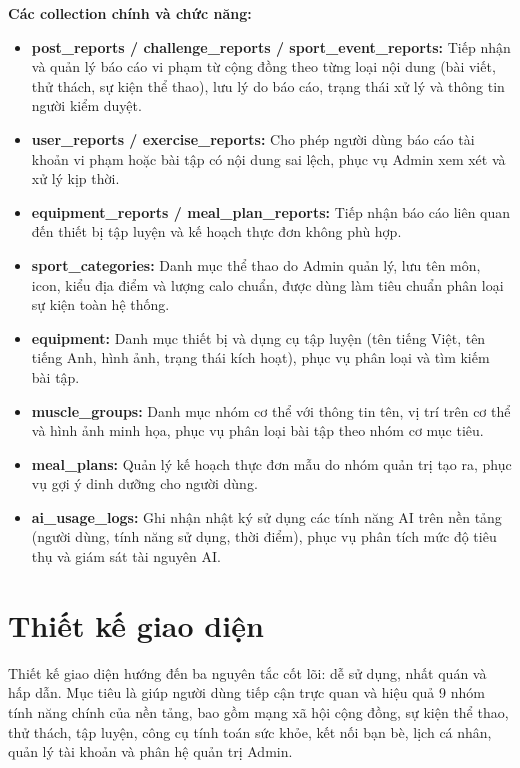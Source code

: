 \textbf{Các collection chính và chức năng:}
\begin{itemize}
    \item \textbf{post\_reports / challenge\_reports / sport\_event\_reports:} Tiếp nhận và quản lý báo cáo vi phạm từ cộng đồng theo từng loại nội dung (bài viết, thử thách, sự kiện thể thao), lưu lý do báo cáo, trạng thái xử lý và thông tin người kiểm duyệt.
    \item \textbf{user\_reports / exercise\_reports:} Cho phép người dùng báo cáo tài khoản vi phạm hoặc bài tập có nội dung sai lệch, phục vụ Admin xem xét và xử lý kịp thời.
    \item \textbf{equipment\_reports / meal\_plan\_reports:} Tiếp nhận báo cáo liên quan đến thiết bị tập luyện và kế hoạch thực đơn không phù hợp.
    \item \textbf{sport\_categories:} Danh mục thể thao do Admin quản lý, lưu tên môn, icon, kiểu địa điểm và lượng calo chuẩn, được dùng làm tiêu chuẩn phân loại sự kiện toàn hệ thống.
    \item \textbf{equipment:} Danh mục thiết bị và dụng cụ tập luyện (tên tiếng Việt, tên tiếng Anh, hình ảnh, trạng thái kích hoạt), phục vụ phân loại và tìm kiếm bài tập.
    \item \textbf{muscle\_groups:} Danh mục nhóm cơ thể với thông tin tên, vị trí trên cơ thể và hình ảnh minh họa, phục vụ phân loại bài tập theo nhóm cơ mục tiêu.
    \item \textbf{meal\_plans:} Quản lý kế hoạch thực đơn mẫu do nhóm quản trị tạo ra, phục vụ gợi ý dinh dưỡng cho người dùng.
    \item \textbf{ai\_usage\_logs:} Ghi nhận nhật ký sử dụng các tính năng AI trên nền tảng (người dùng, tính năng sử dụng, thời điểm), phục vụ phân tích mức độ tiêu thụ và giám sát tài nguyên AI.
\end{itemize}

\section{Thiết kế giao diện}
\label{sec:ui_ux_design}

Thiết kế giao diện hướng đến ba nguyên tắc cốt lõi: dễ sử dụng, nhất quán và hấp dẫn. Mục tiêu là giúp người dùng tiếp cận trực quan và hiệu quả 9 nhóm tính năng chính của nền tảng, bao gồm mạng xã hội cộng đồng, sự kiện thể thao, thử thách, tập luyện, công cụ tính toán sức khỏe, kết nối bạn bè, lịch cá nhân, quản lý tài khoản và phân hệ quản trị Admin.

